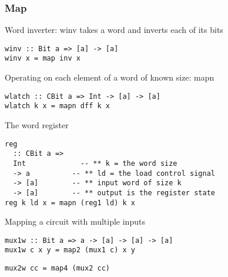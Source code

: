 \documentclass[11pt]{article}
\begin{document}
\subsubsection{Map}
\label{sec:org6195fcd}

Word inverter: winv takes a word and inverts each of its bits


\begin{verbatim}
winv :: Bit a => [a] -> [a]
winv x = map inv x
\end{verbatim}


Operating on each element of a word of known size: mapn


\begin{verbatim}
wlatch :: CBit a => Int -> [a] -> [a]
wlatch k x = mapn dff k x
\end{verbatim}


The word register


\begin{verbatim}
reg
  :: CBit a =>
  Int             -- ** k = the word size
  -> a          -- ** ld = the load control signal
  -> [a]        -- ** input word of size k
  -> [a]        -- ** output is the register state
reg k ld x = mapn (reg1 ld) k x
\end{verbatim}


Mapping a circuit with multiple inputs


\begin{verbatim}
mux1w :: Bit a => a -> [a] -> [a] -> [a]
mux1w c x y = map2 (mux1 c) x y
\end{verbatim}



\begin{verbatim}
mux2w cc = map4 (mux2 cc)
\end{verbatim}
\end{document}
